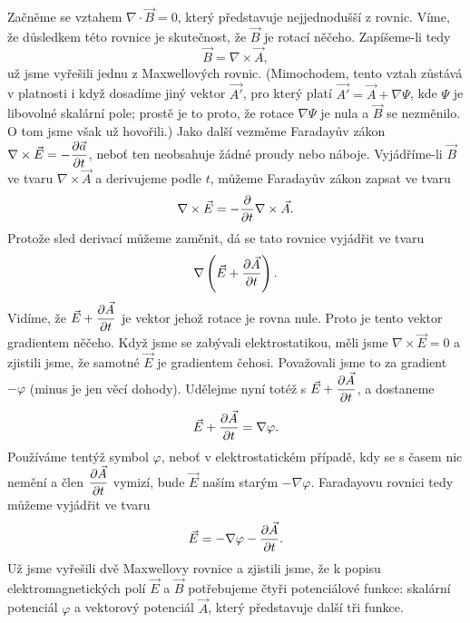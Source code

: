 {  Začněme se vztahem \(\nabla\cdot\vec{B}=0\), který představuje nejjednodušší z rovnic. Víme, že 
  důsledkem této rovnice je skutečnost, že \(\vec{B}\) je rotací něčeho. Zapíšeme-li tedy
  \begin{equation}\label{fyz:eq452}
    \vec{B} = \nabla\times\vec{A},
  \end{equation}
  už jsme vyřešili jednu z Maxwellových rovnic. (Mimochodem, tento vztah zůstává v platnosti i když 
  dosadíme jiný vektor \(\vec{A'}\), pro který platí \(\vec{A'} =\vec{A} +\nabla\Psi\), kde 
  \(\Psi\) je libovolné skalární pole; prostě je to proto, že rotace \(\nabla\Psi\) je nula a 
  \(\vec{B}\) se nezměnilo. O tom jsme však už hovořili.) Jako další vezměme Faradayův zákon 
  \(\nabla\times\vec{E} = - \dfrac{\partial \vec{a}}{\partial t}\), neboť ten neobsahuje žádné proudy nebo náboje. 
  Vyjádříme-li \(\vec{B}\) ve tvaru \(\nabla\times\vec{A}\) a derivujeme podle \(t\), můžeme 
  Faradayův zákon zapsat ve tvaru
  \begin{equation*}
    \nabla\times\vec{E} = - \dfrac{\partial }{\partial t}\nabla\times\vec{A}.
  \end{equation*}
  Protože sled derivací můžeme zaměnit, dá se tato rovnice vyjádřit ve tvaru
  \begin{equation}\label{fyz:eq453}
    \nabla\left(\vec{E} + \dfrac{\partial \vec{A}}{\partial t}\right).
  \end{equation}
  Vidíme, že \(\vec{E} + \dfrac{\partial \vec{A}}{\partial t}\) je vektor jehož rotace je rovna nule. Proto je tento 
  vektor gradientem něčeho. Když jsme se zabývali elektrostatikou, měli jsme \(\nabla\times\vec{E} 
  = 0\) a zjistili jsme, že samotné \(\vec{E}\) je gradientem čehosi. Považovali jsme to za 
  gradient \(-\varphi\) (minus je jen věcí dohody). Udělejme nyní totéž s \(\vec{E} + 
  \dfrac{\partial \vec{A}}{\partial t}\), a dostaneme
  \begin{equation}\label{fyz:eq454}
    \vec{E} + \dfrac{\partial \vec{A}}{\partial t} = \nabla\varphi.
  \end{equation}  
  Používáme tentýž symbol \(\varphi\), neboť v elektrostatickém případě, kdy se s časem nic nemění 
  a člen \(\dfrac{\partial \vec{A}}{\partial t}\) vymizí, bude \(\vec{E}\) naším starým \(-\nabla\varphi\). Faradayovu 
  rovnici tedy můžeme vyjádřit ve tvaru
  \begin{equation}\label{fyz:eq455}
    \vec{E} = - \nabla\varphi - \dfrac{\partial \vec{A}}{\partial t}.
  \end{equation} 
  Už jsme vyřešili dvě Maxwellovy rovnice a zjistili jsme, že k popisu elektromagnetických polí 
  \(\vec{E}\) a \(\vec{B}\) potřebujeme čtyři potenciálové funkce: skalární potenciál \(\varphi\) a 
  vektorový potenciál \(\vec{A}\), který představuje další tři funkce.
  
}

